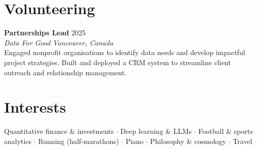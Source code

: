 \documentclass[10pt,a4paper]{article}
\newcommand{\cventry}[4]{%
  {\textbf{#1}} \hfill {\small #2}\\[-3pt]
  {\textit{\small #3}} \hfill {\textit{\small #4}}%
}
\begin{document}
\section{Volunteering}

\cventry{Partnerships Lead}{2025}{Data For Good}{Vancouver, Canada}\\[1pt]
{\small Engaged nonprofit organisations to identify data needs and develop impactful project strategies.
Built and deployed a CRM system to streamline client outreach and relationship management.}

\section{Interests}

{\small Quantitative finance \& investments $\cdot$ Deep learning \& LLMs $\cdot$ Football \& sports analytics
$\cdot$ Running (half-marathons) $\cdot$ Piano $\cdot$ Philosophy \& cosmology $\cdot$ Travel}
\end{document}
